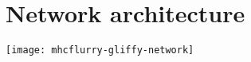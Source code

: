 
\section{Network architecture}

\graphicspath{ {images/} } 
\texttt{[image: mhcflurry-gliffy-network]}